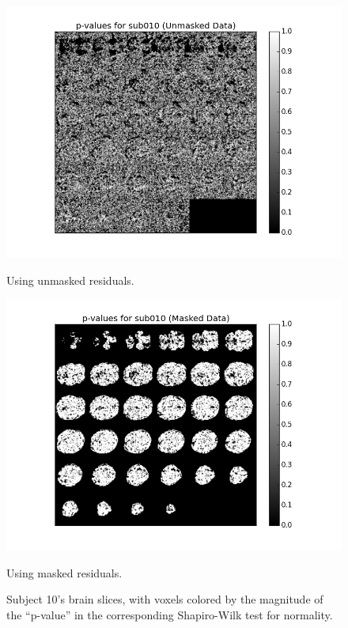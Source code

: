 \begin{figure}[ht]
\centering
\begin{minipage}[b]{0.45\linewidth}
	\centering
	\includegraphics[width=.8\linewidth]{../images/sub010sw.png} 
	\caption{Using unmasked residuals.}
\end{minipage}	
\quad
\begin{minipage}[b]{0.45\linewidth}
	\centering
		\includegraphics[width=.8\linewidth]{../images/sub010swmasked.png} 
	\caption{Using masked residuals.}
\end{minipage}
\caption{Subject 10's brain slices, with voxels colored by the magnitude of the
``p-value'' in the corresponding Shapiro-Wilk test for normality.}
\label{fig:sw}
\end{figure}
